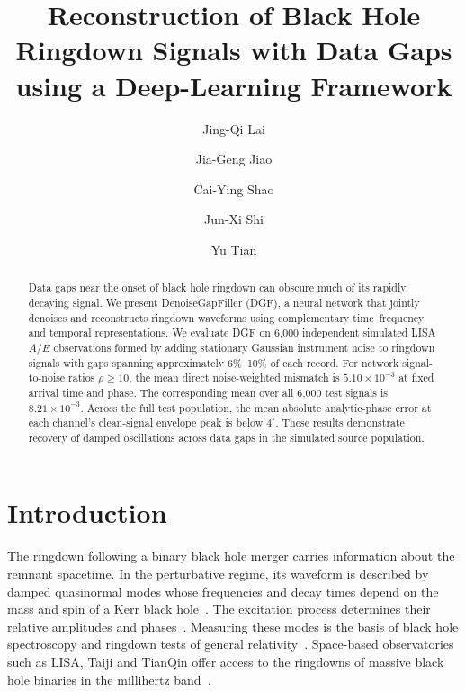 \documentclass[10pt,prd,aps,a4paper,twocolumn,superscriptaddress,nofootinbib,floatfix]{revtex4-2}
\begin{document}
\title{Reconstruction of Black Hole Ringdown Signals with Data Gaps using a Deep-Learning Framework}
\author{Jing-Qi Lai}
\author{Jia-Geng Jiao}
\author{Cai-Ying Shao}

\author{Jun-Xi Shi}
\author{Yu Tian}

\begin{abstract}
Data gaps near the onset of black hole ringdown can obscure much of its rapidly decaying signal. We present DenoiseGapFiller (DGF), a neural network that jointly denoises and reconstructs ringdown waveforms using complementary time--frequency and temporal representations. We evaluate DGF on 6,000 independent simulated LISA $A/E$ observations formed by adding stationary Gaussian instrument noise to ringdown signals with gaps spanning approximately 6\%--10\% of each record. For network signal-to-noise ratios $\rho\ge10$, the mean direct noise-weighted mismatch is $5.10\times10^{-3}$ at fixed arrival time and phase. The corresponding mean over all 6,000 test signals is $8.21\times10^{-3}$. Across the full test population, the mean absolute analytic-phase error at each channel's clean-signal envelope peak is below $4^\circ$. These results demonstrate recovery of damped oscillations across data gaps in the simulated source population.
\end{abstract}

\maketitle
\section{Introduction}
The ringdown following a binary black hole merger carries information about the remnant spacetime. In the perturbative regime, its waveform is described by damped quasinormal modes whose frequencies and decay times depend on the mass and spin of a Kerr black hole~\cite{berti2006gravitational,berti2009qnm}. The excitation process determines their relative amplitudes and phases~\cite{Zhang2013Excitation}. Measuring these modes is the basis of black hole spectroscopy and ringdown tests of general relativity~\cite{Isi_2019}. Space-based observatories such as LISA, Taiji and TianQin offer access to the ringdowns of massive black hole binaries in the millihertz band~\cite{amaroseoane2017laserinterferometerspaceantenna,robson2019construction,Ruan2020,Luo2016}.
\end{document}
